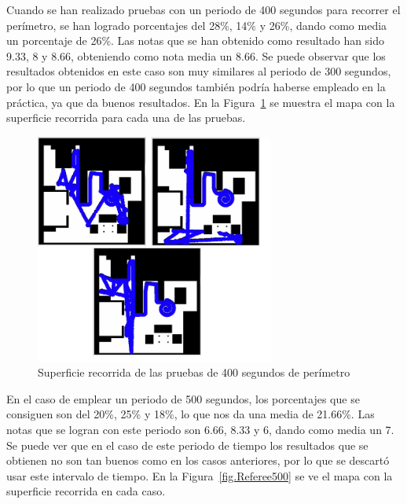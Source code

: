 Cuando se han realizado pruebas con un periodo de 400 segundos para recorrer el perímetro, se han logrado porcentajes del 28\%, 14\% y 26\%, dando como media un porcentaje de 26\%. Las notas que se han obtenido como resultado han sido 9.33, 8 y 8.66, obteniendo como nota media un 8.66. Se puede observar que los resultados obtenidos en este caso son muy similares al periodo de 300 segundos, por lo que un periodo de 400 segundos también podría haberse empleado en la práctica, ya que da buenos resultados. En la Figura~\ref{fig.Referee400} se muestra el mapa con la superficie recorrida para cada una de las pruebas.

\begin{figure}[H]
  \begin{center}
    \includegraphics[width=0.7\textwidth]{figures/Vacuum/Referee400.png}
		\caption{Superficie recorrida de las pruebas de 400 segundos de perímetro}
		\label{fig.Referee400}
		\end{center}
\end{figure}

En el caso de emplear un periodo de 500 segundos, los porcentajes que se consiguen son del 20\%, 25\% y 18\%, lo que nos da una media de 21.66\%. Las notas que se logran con este periodo son 6.66, 8.33 y 6, dando como media un 7. Se puede ver que en el caso de este periodo de tiempo los resultados que se obtienen no son tan buenos como en los casos anteriores, por lo que se descartó usar este intervalo de tiempo. En la Figura~\ref{fig.Referee500} se ve el mapa con la superficie recorrida en cada caso.\\

